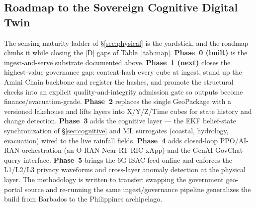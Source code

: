 \documentclass[10pt,twocolumn]{article}
\begin{document}
\subsection{Roadmap to the Sovereign Cognitive Digital Twin}
\label{sec:roadmap}
The sensing-maturity ladder of \S\ref{sec:physical} is the yardstick, and the roadmap
climbs it while closing the [D] gaps of Table~\ref{tab:map}. \textbf{Phase~0 (built)}
is the ingest-and-serve substrate documented above. \textbf{Phase~1 (next)} closes the
highest-value governance gap: content-hash every cube at ingest, stand up the Amini
Chain backbone and register the hashes, and promote the structural checks into an
explicit quality-and-integrity admission gate so outputs become
finance/evacuation-grade. \textbf{Phase~2} replaces the single GeoPackage with a
versioned lakehouse and lifts layers into X/Y/Z/Time cubes for state history and
change detection. \textbf{Phase~3} adds the cognitive layer --- the EKF belief-state
synchronization of \S\ref{sec:cognitive} and ML surrogates (coastal, hydrology,
evacuation) wired to the live rainfall fields. \textbf{Phase~4} adds closed-loop
PPO/AI-RAN orchestration (an O-RAN Near-RT RIC xApp) and the GenAI GovChat query
interface. \textbf{Phase~5} brings the 6G ISAC feed online and enforces the L1/L2/L3
privacy waveforms and cross-layer anomaly detection at the physical layer. The
methodology is written to transfer: swapping the government geo-portal source and
re-running the same ingest/governance pipeline generalizes the build from Barbados to
the Philippines archipelago.
\end{document}
